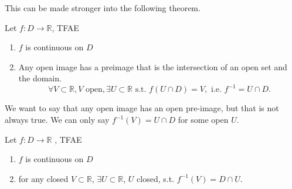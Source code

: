 \begin{remark}
    This can be made stronger into the following theorem.
\end{remark}

\begin{theorem}
    Let $f: D \to \mathbb{R}$, TFAE 
    \begin{enumerate}
        \item $f$ is continuous on $D$
        \item Any open image has a preimage that is the 
        intersection of an open set and the domain.
        \[
        \forall V \subset \mathbb{R}, 
        V \text{ open},
        \exists U \subset \mathbb{R} 
        \text{ s.t. }
        f(U \cap D) = V, 
        \text{ i.e. }
        f^{-1} = U \cap D.
        \]
    \end{enumerate} 
\end{theorem}

\begin{remark}
    We want to say that any open image has an 
    open pre-image, but that is not always true.
    We can only say $f^{-1}(V) = U \cap D$
    for some open $U$.
\end{remark}

\begin{corollary}
    Let $f: D \to \mathbb{R}$ , TFAE
    \begin{enumerate}
        \item $f$ is continuous on $D$
        \item for any closed $V \subset \mathbb{R}$,
        $\exists U \subset \mathbb{R}$, $U$ closed, 
        s.t. 
        $f^{-1}(V) = D \cap U$.
    \end{enumerate} 
\end{corollary}

